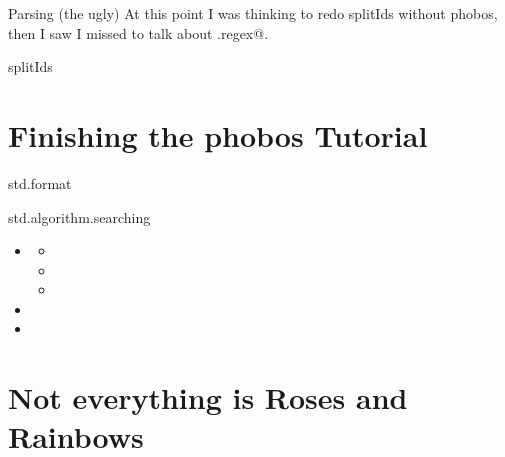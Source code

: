 \documentclass[aspectratio=169,notes]{beamer}
\begin{document}
	\begin{frame}[fragile]{Parsing (the ugly)}
At this point I was thinking to redo splitIds without phobos, then I saw I missed to
talk about \lstinline@std.regex@.
	\end{frame}

	\begin{frame}[fragile]{splitIds}
		
	\end{frame}

	\section{Finishing the phobos Tutorial}
	\begin{frame}[fragile]{std.format}
		
	\end{frame}

	\begin{frame}[fragile]{std.algorithm.searching}
		\begin{itemize}
			\item \lstinline@find@
			\begin{itemize}
				\item \lstinline@canFind@
				\item \lstinline@until@
				\item \lstinline@countUntil@
			\end{itemize}
			\item \lstinline@startsWith@
			\item \lstinline@endsWith@
		\end{itemize}
	\end{frame}

	\section{Not everything is Roses and Rainbows}
\end{document}
